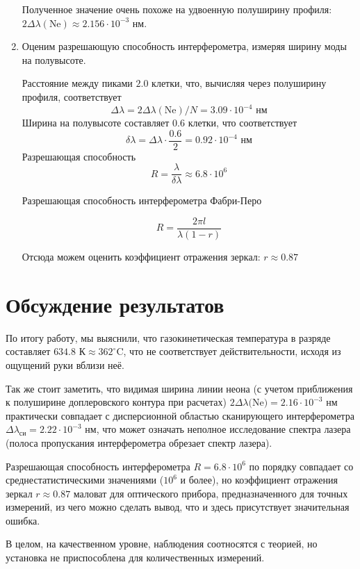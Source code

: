 \begin{enumerate}
Полученное значение очень похоже на удвоенную полуширину профиля: $2\Delta\lambda(\text{Ne}) \approx 2.156 \cdot 10^{-3} \text{ нм}$.

\item
Оценим разрешающую способность интерферометра, измеряя ширину моды на полувысоте.

Расстояние между пиками $2.0$ клетки, что, вычисляя через полуширину профиля, соответствует $$\Delta\lambda = 2\Delta\lambda(\text{Ne})/N = 3.09\cdot10^{-4}\text{ нм}$$
Ширина на полувысоте составляет $0.6$ клетки, что соответствует $$\delta\lambda = \Delta\lambda\cdot\frac{0.6}{2} = 0.92 \cdot 10^{-4}\text{ нм}$$
Разрешающая способность $$R=\frac{\lambda}{\delta\lambda} \approx 6.8\cdot 10^6$$

Разрешающая способность интерферометра Фабри-Перо

\begin{equation}
    R = \frac{2\pi l}{\lambda(1-r)}
\end{equation}

Отсюда можем оценить коэффициент отражения зеркал: $r\approx0.87$

\end{enumerate}

\section{Обсуждение результатов}
По итогу работу, мы выяснили, что газокинетическая температура в разряде составляет $634.8\text{ К} \approx 362 ^\circ\text{C}$, что не соответствует действительности, исходя из ощущений руки вблизи неё. 

Так же стоит заметить, что видимая ширина линии неона (с учетом приближения к полуширине доплеровского контура при расчетах) $2\Delta \lambda\text{(Ne)} = 2.16\cdot10^{-3}\text{ нм}$ практически совпадает с дисперсионной областью сканирующего интерферометра $\Delta \lambda_{\text{си}} = 2.22\cdot10^{-3}\text{ нм}$, что может означать неполное исследование спектра лазера (полоса пропускания интерферометра обрезает спектр лазера).

Разрешающая способность интерферометра $R = 6.8\cdot10^6$ по порядку совпадает со среднестатистическими значениями ($10^6$ и более), но коэффициент отражения зеркал $r \approx 0.87$ маловат для оптического прибора, предназначенного для точных измерений, из чего можно сделать вывод, что и здесь присутствует значительная ошибка.

В целом, на качественном уровне, наблюдения соотносятся с теорией, но установка не приспособлена для количественных измерений.

